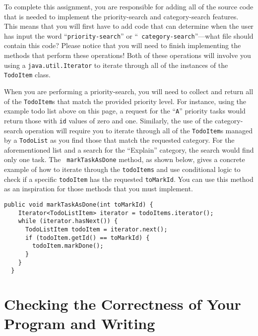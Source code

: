 \documentclass[11pt]{article}
\begin{document}
To complete this assignment, you are responsible for adding all of the source
code that is needed to implement the priority-search and category-search
features. This means that you will first have to add code that can determine
when the user has input the word ``{\tt priority-search}'' or ``{\tt
category-search}''---what file should contain this code? Please notice that you
will need to finish implementing the methods that perform these operations! Both
of these operations will involve you using a {\tt java.util.Iterator} to iterate
through all of the instances of the {\tt TodoItem} class.

When you are performing a priority-search, you will need to collect and return
all of the {\tt TodoItem}s that match the provided priority level. For instance,
using the example todo list above on this page, a request for the ``{\tt A}''
priority tasks would return those with {\tt id} values of zero and one.
Similarly, the use of the category-search operation will require you to iterate
through all of the {\tt TodoItem}s managed by a {\tt TodoList} as you find those
that match the requested category. For the aforementioned list and a search for
the ``Explain'' category, the search would find only one task. The {\tt
  markTaskAsDone} method, as shown below, gives a concrete example of how to
  iterate through the {\tt todoItems} and use conditional logic to check if a
  specific {\tt todoItem} has the requested {\tt toMarkId}. You can use this
  method as an inspiration for those methods that you must implement.

\vspace{-0.05in}
\begin{verbatim}
public void markTaskAsDone(int toMarkId) {
    Iterator<TodoListItem> iterator = todoItems.iterator();
    while (iterator.hasNext()) {
      TodoListItem todoItem = iterator.next();
      if (todoItem.getId() == toMarkId) {
        todoItem.markDone();
      }
    }
  }
\end{verbatim}

\section*{Checking the Correctness of Your Program and Writing}
\end{document}
